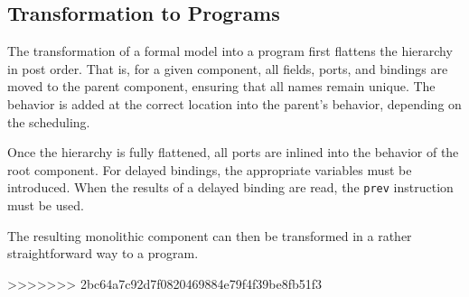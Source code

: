 \documentclass[a4paper,10pt,english]{article}
\begin{document}
\subsection{Transformation to \Fil Programs}
The transformation of a formal model into a \Fil program first flattens the hierarchy in post order. That is, for a given
component, all fields, ports, and bindings are moved to the parent component, ensuring that all names remain unique. The behavior
is added at the correct location into the parent's behavior, depending on the scheduling. 

Once the hierarchy is fully flattened, all ports are inlined into the behavior of the root component. For delayed bindings, the
appropriate variables must be introduced. When the results of a delayed binding are read, the \texttt{prev} instruction must be used.

The resulting monolithic component can then be transformed in a rather straightforward way to a \Fil program.

>>>>>>> 2bc64a7c92d7f0820469884e79f4f39be8fb51f3
\end{document}

